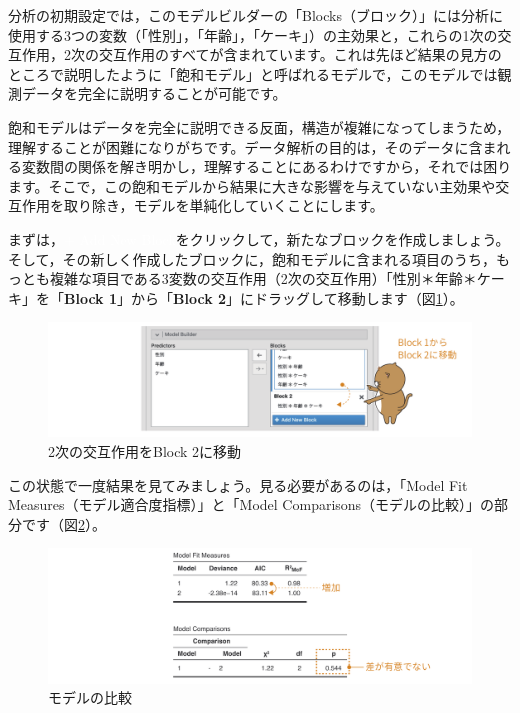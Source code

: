 \documentclass[
  12pt,
  a5jpaper,
  lualatex, ja=standard]{bxjsbook}
\begin{document}
分析の初期設定では，このモデルビルダーの「Blocks（ブロック）」には分析に使用する3つの変数（「性別」，「年齢」，「ケーキ」）の主効果と，これらの1次の交互作用，2次の交互作用のすべてが含まれています。これは先ほど結果の見方のところで説明したように「飽和モデル」と呼ばれるモデルで，このモデルでは観測データを完全に説明することが可能です。

飽和モデルはデータを完全に説明できる反面，構造が複雑になってしまうため，理解することが困難になりがちです。データ解析の目的は，そのデータに含まれる変数間の関係を解き明かし，理解することにあるわけですから，それでは困ります。そこで，この飽和モデルから結果に大きな影響を与えていない主効果や交互作用を取り除き，モデルを単純化していくことにします。

まずは，\colorbox{ao}{\textcolor{white}{+ Add New Block}}をクリックして，新たなブロックを作成しましょう。そして，その新しく作成したブロックに，飽和モデルに含まれる項目のうち，もっとも複雑な項目である3変数の交互作用（2次の交互作用）「性別＊年齢＊ケーキ」を「\textbf{Block 1}」から「\textbf{Block 2}」にドラッグして移動します（図\ref{fig:frequencies-loglin-modelbuilder-2way-interaction}）。

\begin{figure}[!ht]

{\centering \includegraphics[width=1\linewidth]{images/frequencies/loglin-modelbuilder-2way-interaction} 

}

\caption{2次の交互作用をBlock 2に移動}\label{fig:frequencies-loglin-modelbuilder-2way-interaction}
\end{figure}

この状態で一度結果を見てみましょう。見る必要があるのは，「Model Fit Measures（モデル適合度指標）」と「Model Comparisons（モデルの比較）」の部分です（図\ref{fig:frequencies-loglin-modelbuilder-comparison}）。

\begin{figure}[!ht]

{\centering \includegraphics[width=1\linewidth]{images/frequencies/loglin-modelbuilder-comparison} 

}

\caption{モデルの比較}\label{fig:frequencies-loglin-modelbuilder-comparison}
\end{figure}
\end{document}
